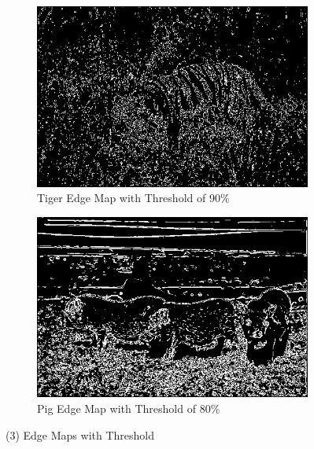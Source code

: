 \documentclass[12pt]{article}
\begin{document}
\begin{figure}[H]
	\centering 
	\begin{subfigure}{0.45\textwidth}
		\centering
		\includegraphics[width=\textwidth]{Tiger90.jpg}
		\caption{Tiger Edge Map with Threshold of 90\%}
		\label{fig:tiger.90}
	\end{subfigure}
	\hfill
	\begin{subfigure}{0.45\textwidth}
		\centering
		\includegraphics[width=\textwidth]{Pig80.jpg}
		\caption{Pig Edge Map with Threshold of 80\%}
		\label{fig:pig.80}
	\end{subfigure}
	\caption{(3) Edge Maps with Threshold}
	\label{p1a3}
\end{figure}
\end{document}
